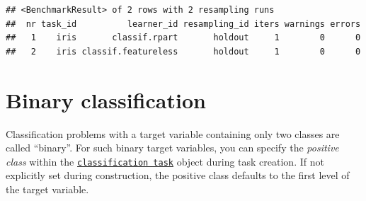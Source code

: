 \documentclass[]{scrbook}
\newenvironment{Shaded}{\begin{snugshade}}{\end{snugshade}}
\newcommand{\CommentTok}[1]{\textcolor[rgb]{0.56,0.35,0.01}{\textit{#1}}}
\newcommand{\DataTypeTok}[1]{\textcolor[rgb]{0.13,0.29,0.53}{#1}}
\newcommand{\KeywordTok}[1]{\textcolor[rgb]{0.13,0.29,0.53}{\textbf{#1}}}
\newcommand{\NormalTok}[1]{#1}
\newcommand{\OperatorTok}[1]{\textcolor[rgb]{0.81,0.36,0.00}{\textbf{#1}}}
\newcommand{\StringTok}[1]{\textcolor[rgb]{0.31,0.60,0.02}{#1}}
\renewenvironment{Shaded} {\begin{snugshade}\small} {\end{snugshade}}
\begin{document}
\begin{Shaded}
\end{Shaded}

\begin{verbatim}
## <BenchmarkResult> of 2 rows with 2 resampling runs
##  nr task_id          learner_id resampling_id iters warnings errors
##   1    iris       classif.rpart       holdout     1        0      0
##   2    iris classif.featureless       holdout     1        0      0
\end{verbatim}

\hypertarget{binary-classification}{%
\section{Binary classification}\label{binary-classification}}

Classification problems with a target variable containing only two classes are called ``binary''.
For such binary target variables, you can specify the \emph{positive class} within the \href{https://mlr3.mlr-org.com/reference/TaskClassif.html}{\texttt{classification\ task}} object during task creation.
If not explicitly set during construction, the positive class defaults to the first level of the target variable.

\begin{Shaded}
\end{Shaded}
\end{document}

